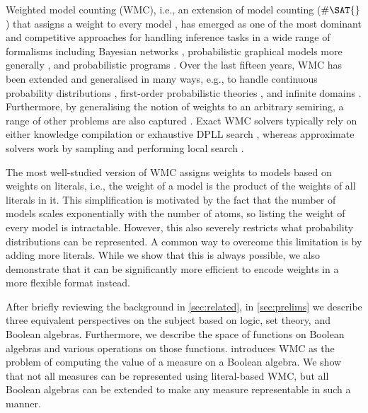 \documentclass{article}
\begin{document}
Weighted model counting (WMC), i.e., an extension of model counting ($\#\SAT{}$)
that assigns a weight to every model \cite{DBLP:conf/aaai/SangBK05}, has emerged
as one of the most dominant and competitive approaches for handling inference
tasks in a wide range of formalisms including Bayesian networks
\cite{DBLP:conf/aaai/SangBK05,DBLP:books/daglib/0024906}, probabilistic
graphical models more generally \cite{DBLP:conf/ecsqaru/ChoiKD13}, and
probabilistic programs
\cite{DBLP:journals/tplp/FierensBRSGTJR15,DBLP:journals/corr/abs-2005-09089}.
Over the last fifteen years, WMC has been extended and generalised in many ways,
e.g., to handle continuous probability distributions
\cite{DBLP:conf/ijcai/BellePB15}, first-order probabilistic theories
\cite{DBLP:conf/ijcai/BroeckTMDR11,DBLP:journals/cacm/GogateD16}, and infinite
domains \cite{DBLP:conf/aaai/Belle17}. Furthermore, by generalising the notion
of weights to an arbitrary semiring, a range of other problems are also captured
\cite{DBLP:journals/japll/KimmigBR17}. Exact WMC solvers typically rely on
either knowledge compilation
\cite{DBLP:conf/ijcai/OztokD15,DBLP:conf/ijcai/LagniezM17} or exhaustive DPLL
search \cite{DBLP:conf/aaai/SangBK05}, whereas approximate solvers work by
sampling \cite{DBLP:conf/aaai/ChakrabortyFMSV14} and performing local search
\cite{DBLP:conf/sat/WeiS05}.

The most well-studied version of WMC assigns weights to models based on
weights on literals, i.e., the weight of a model is the product of the weights
of all literals in it. This simplification is motivated by the fact that the
number of models scales exponentially with the number of atoms, so listing the
weight of every model is intractable. However, this also severely restricts what
probability distributions can be represented. A common way to overcome this
limitation is by adding more literals. While we show that this is always
possible, we also demonstrate that it can be significantly more efficient to
encode weights in a more flexible format instead.

After briefly reviewing the background in \cref{sec:related}, in
\cref{sec:prelims} we  describe three equivalent perspectives on the subject
based on logic, set theory, and Boolean algebras. Furthermore, we describe the
space of functions on Boolean algebras and various operations on those
functions.  introduces WMC as the problem of computing
the value of a measure on a Boolean algebra. We show that not all measures can
be represented using literal-based WMC, but all Boolean algebras can be extended
to make any measure representable in such a manner.
\end{document}
